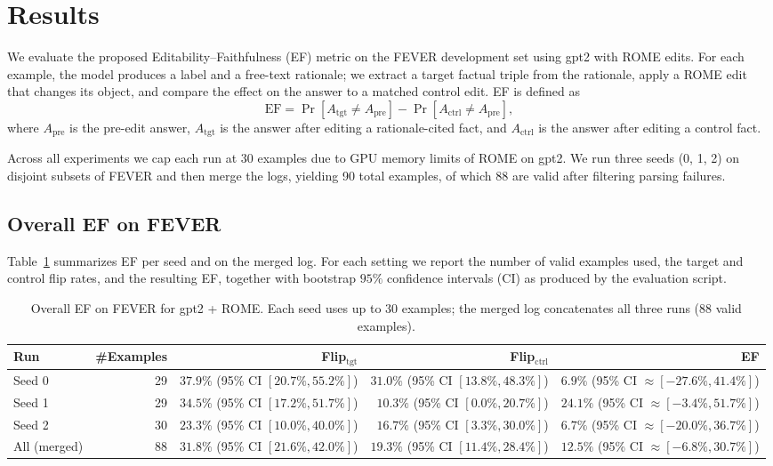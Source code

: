 \documentclass[11pt]{article}
\begin{document}
\section*{Results}

We evaluate the proposed Editability--Faithfulness (EF) metric on the FEVER development set using gpt2 with ROME edits. For each example, the model produces a label and a free-text rationale; we extract a target factual triple from the rationale, apply a ROME edit that changes its object, and compare the effect on the answer to a matched control edit. EF is defined as
\[
\mathrm{EF} = \Pr[A_{\text{tgt}} \neq A_{\text{pre}}] - \Pr[A_{\text{ctrl}} \neq A_{\text{pre}}],
\]
where $A_{\text{pre}}$ is the pre-edit answer, $A_{\text{tgt}}$ is the answer after editing a rationale-cited fact, and $A_{\text{ctrl}}$ is the answer after editing a control fact.

Across all experiments we cap each run at 30 examples due to GPU memory limits of ROME on gpt2. We run three seeds (0, 1, 2) on disjoint subsets of FEVER and then merge the logs, yielding 90 total examples, of which 88 are valid after filtering parsing failures.

\subsection*{Overall EF on FEVER}

Table~\ref{tab:overall-ef} summarizes EF per seed and on the merged log. For each setting we report the number of valid examples used, the target and control flip rates, and the resulting EF, together with bootstrap $95\%$ confidence intervals (CI) as produced by the evaluation script.

\begin{table}[h]
  \centering
  \caption{Overall EF on FEVER for gpt2 + ROME. Each seed uses up to 30 examples; the merged log concatenates all three runs (88 valid examples).}
  \label{tab:overall-ef}
  \begin{tabular}{lrrrr}
    \toprule
    Run & \#Examples & Flip$_{\text{tgt}}$ & Flip$_{\text{ctrl}}$ & EF \\
    \midrule
    Seed 0 & 29 & $37.9\%$ \;(95\% CI $[20.7\%, 55.2\%]$) & $31.0\%$ \;(95\% CI $[13.8\%, 48.3\%]$) & $6.9\%$ \;(95\% CI $\approx[-27.6\%, 41.4\%]$) \\
    Seed 1 & 29 & $34.5\%$ \;(95\% CI $[17.2\%, 51.7\%]$) & $10.3\%$ \;(95\% CI $[0.0\%, 20.7\%]$)  & $24.1\%$ \;(95\% CI $\approx[-3.4\%, 51.7\%]$) \\
    Seed 2 & 30 & $23.3\%$ \;(95\% CI $[10.0\%, 40.0\%]$) & $16.7\%$ \;(95\% CI $[3.3\%, 30.0\%]$)  & $6.7\%$ \;(95\% CI $\approx[-20.0\%, 36.7\%]$) \\
    \midrule
    All (merged) & 88 & $31.8\%$ \;(95\% CI $[21.6\%, 42.0\%]$) & $19.3\%$ \;(95\% CI $[11.4\%, 28.4\%]$) & $12.5\%$ \;(95\% CI $\approx[-6.8\%, 30.7\%]$) \\
    \bottomrule
  \end{tabular}
\end{table}
\end{document}
